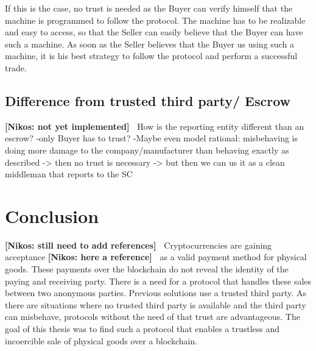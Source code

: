 \documentclass{cacthesis}
\newcommand{\authnote}[3]{{ \footnotesize \textbf{#1[#2: #3]~}}}
\newcommand{\orfnote}[1]{\authnote{\color{blue}}{Orfeas}{#1}}
\newcommand{\niknote}[1]{\authnote{\color{red}}{Nikos}{#1}}
\begin{document}
If this is the case, no trust is needed as the Buyer can verify himself that the machine is programmed to follow the protocol. The machine has to be realizable and easy to access, so that the Seller can
easily believe that the Buyer can have such a machine. As soon as the Seller believes that the Buyer us using such a machine, it is his best strategy to follow the protocol and perform a successful trade.



\section{Difference from trusted third party/ Escrow}
\niknote{not yet implemented}
How is the reporting entity different than an escrow?
-only Buyer has to trust?
-Maybe even model rational: misbehaving is doing more damage to the company/manufacturer than behaving exactly as described -> then no trust is necessary -> but then we can us it as a clean middleman that reports to the SC

\chapter{Conclusion}
\label{cha:conclusion}
\niknote{still need to add references}\newline
Cryptocurrencies are gaining acceptance\niknote{here a reference} as a valid payment method for physical goods. These payments over the blockchain do not reveal the identity of the paying and receiving party. There is a need for a protocol that handles these sales between two anonymous parties. Previous solutions use a trusted third party. As there are situations where no trusted third party is available and the third party can misbehave, protocols without the need of that trust are advantageous. The goal of this thesis was to find such a protocol that enables a trustless and incoercible sale of physical goods over a blockchain.\newline
\end{document}
